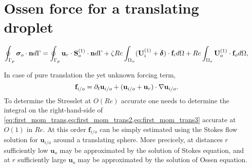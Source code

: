 \section{Ossen force for a translating droplet}
\begin{equation}
    \intS[p]{\bm\sigma_{o}\cdot \textbf{n}}
    =
    \intS[p]{\textbf{u}_{r}\cdot \textbf{S}_{o}^{(1)}\cdot \textbf{n}}
    + \zeta Re \intO{(\textbf{U}_{i}^{(1)} + \bm\delta)\cdot \textbf{f}_{i}}
    + Re\intO[o]{\textbf{U}_{o}^{(1)}\cdot \textbf{f}_{o}},
\end{equation}

In case of pure translation the yet unknown forcing term,
\begin{equation}
    \textbf{f}_{i/o} =
    \pddt \textbf{u}_{i/o}
    + (\textbf{u}_{i/o}+\textbf{u}_r)\cdot \grad \textbf{u}_{i/o}.
\end{equation}
To determine the Stresslet at $O(Re)$ accurate one needs to determine the integral on the right-hand-side of \ref{eq:first_mom_trans,eq:first_mom_trans2,eq:first_mom_trans3} accurate at $O(1)$ in $Re$.
At this order $\textbf{f}_{i/o}$ can be simply estimated using the Stokes flow solution for $\textbf{u}_{i/o}$ around a translating sphere.
More precicely, at distances $r$ sufficiently low  $\textbf{u}_o$ may be approximated by the solution of Stokes equation, and at $r$ sufficiently large $\textbf{u}_o$ may be approximated by the solution of Ossen equation.

